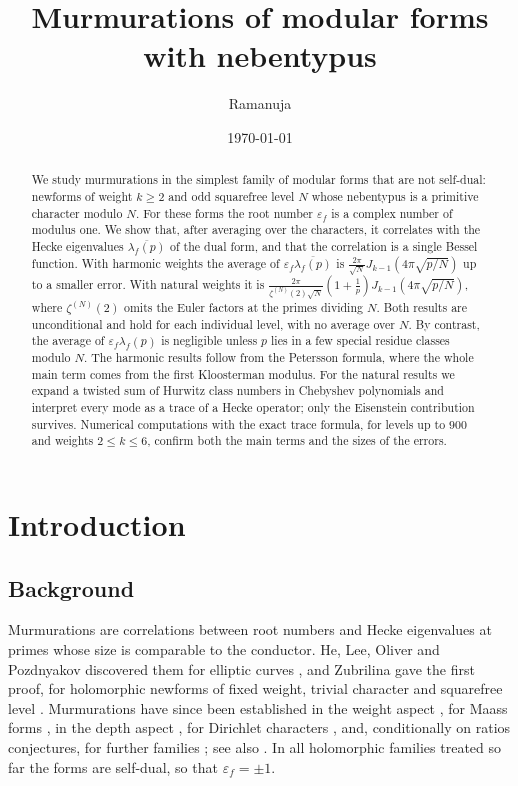 \documentclass[11pt]{amsart}
\title{Murmurations of modular forms with nebentypus}
\author{Ramanuja}
\date{\today}
\theoremstyle{remark}
\newcommand{\eps}{\varepsilon}
\newcommand{\ov}{\overline}
\begin{document}
\begin{abstract}
We study murmurations in the simplest family of modular forms that are not self-dual: newforms of weight $k\ge2$ and odd squarefree level $N$ whose nebentypus is a primitive character modulo $N$. For these forms the root number $\eps_f$ is a complex number of modulus one. We show that, after averaging over the characters, it correlates with the Hecke eigenvalues $\ov{\lambda_f(p)}$ of the dual form, and that the correlation is a single Bessel function. With harmonic weights the average of $\eps_f\ov{\lambda_f(p)}$ is $\frac{2\pi}{\sqrt N}J_{k-1}(4\pi\sqrt{p/N})$ up to a smaller error. With natural weights it is $\frac{2\pi}{\zeta^{(N)}(2)\sqrt N}(1+\frac1p)J_{k-1}(4\pi\sqrt{p/N})$, where $\zeta^{(N)}(2)$ omits the Euler factors at the primes dividing $N$. Both results are unconditional and hold for each individual level, with no average over $N$. By contrast, the average of $\eps_f\lambda_f(p)$ is negligible unless $p$ lies in a few special residue classes modulo $N$. The harmonic results follow from the Petersson formula, where the whole main term comes from the first Kloosterman modulus. For the natural results we expand a twisted sum of Hurwitz class numbers in Chebyshev polynomials and interpret every mode as a trace of a Hecke operator; only the Eisenstein contribution survives. Numerical computations with the exact trace formula, for levels up to $900$ and weights $2\le k\le6$, confirm both the main terms and the sizes of the errors.
\end{abstract}

\maketitle

\section{Introduction}

\subsection{Background}
Murmurations are correlations between root numbers and Hecke eigenvalues at primes whose size is comparable to the conductor. He, Lee, Oliver and Pozdnyakov discovered them for elliptic curves \cite{HLOP}, and Zubrilina gave the first proof, for holomorphic newforms of fixed weight, trivial character and squarefree level \cite{Zub}. Murmurations have since been established in the weight aspect \cite{BBLLD,KL}, for Maass forms \cite{BLLDSHZ}, in the depth aspect \cite{Tom}, for Dirichlet characters \cite{LOP}, and, conditionally on ratios conjectures, for further families \cite{Cow}; see also \cite{LD,Car}. In all holomorphic families treated so far the forms are self-dual, so that $\eps_f=\pm1$.
\end{document}
